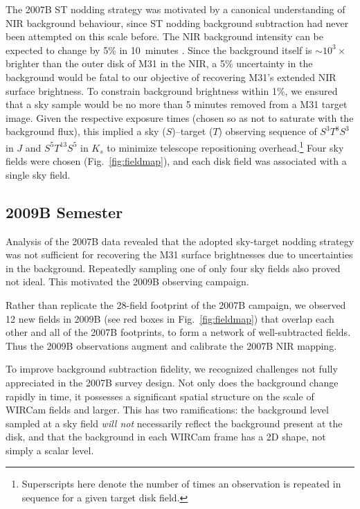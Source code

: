 \documentclass[iop,tighten]{emulateapj}
\newcommand{\Fig}[1]{Fig.~\ref{fig:#1}}  %
\begin{document}
The 2007B ST nodding strategy was motivated by a canonical understanding of NIR background behaviour, since ST nodding background subtraction had never been attempted on this scale before.
The NIR background intensity can be expected to change by 5\% in 10~minutes \citep{Adams:1996,Vaduvescu:2004}.
Since the background itself is $\sim10^3\times$ brighter than the outer disk of M31 in the NIR, a 5\% uncertainty in the background would be fatal to our objective of recovering M31's extended NIR surface brightness.
To constrain background brightness within 1\%, we ensured that a sky sample would be no more than 5 minutes removed from a M31 target image.
Given the respective exposure times (chosen so as not to saturate with the background flux), this implied a sky ($S$)--target ($T$) observing sequence of $S^3T^8S^3$ in $J$ and $S^5T^{13}S^5$ in $K_s$ to minimize telescope repositioning overhead.\footnote{Superscripts here denote the number of times an observation is repeated in sequence for a given target disk field.}
Four sky fields were chosen (\Fig{fieldmap}), and each disk field was associated with a single sky field.

\subsection{2009B Semester}
\label{sub:obs9}

Analysis of the 2007B data revealed that the adopted sky-target nodding strategy was not sufficient for recovering the M31 surface brightnesses due to uncertainties in the background.
Repeatedly sampling one of only four sky fields also proved not ideal.
This motivated the 2009B observing campaign.

Rather than replicate the 28-field footprint of the 2007B campaign, we observed 12 new fields in 2009B (see red boxes in \Fig{fieldmap}) that overlap each other and all of the 2007B footprints, to form a network of well-subtracted fields.
Thus the 2009B observations augment and calibrate the 2007B NIR mapping.

To improve background subtraction fidelity, we recognized challenges not fully appreciated in the 2007B survey design.
Not only does the background change rapidly in time, it possesses a significant spatial structure on the scale of WIRCam fields and larger.
This has two ramifications: the background level sampled at a sky field \emph{will not} necessarily reflect the background present at the disk, and that the background in each WIRCam frame has a 2D shape, not simply a scalar level.
\end{document}
